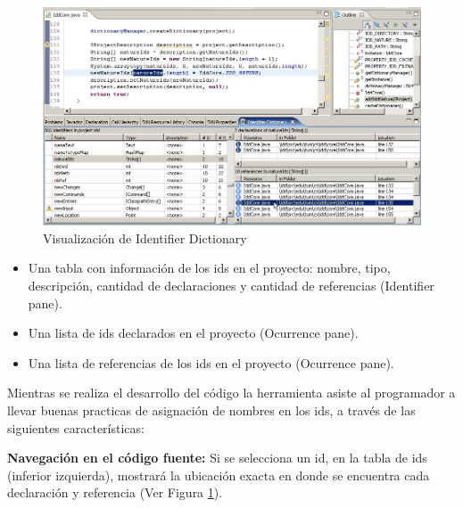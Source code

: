 \begin{figure}[t] %
\centerline{%
\includegraphics[scale= 0.50]{./cap3/idd_3.png}
}
\caption{Visualización de Identifier Dictionary}
\label{captura4}
\end{figure} 

\begin{itemize}
\itemsep0em%
\item Una tabla con información de los ids en el proyecto: nombre, tipo, descripción, cantidad de declaraciones y cantidad de referencias (Identifier pane).
\item Una lista de ids declarados en el proyecto (Ocurrence pane).
\item Una lista de referencias de los ids en el proyecto (Ocurrence pane).
\end{itemize}

Mientras se realiza el desarrollo del código la herramienta asiste al programador a llevar buenas practicas de asignación de nombres en los ids, a través de las siguientes características:

\textbf{Navegación en el código fuente:} Si se selecciona un id, en la tabla de ids (inferior izquierda), mostrará la ubicación exacta en donde se encuentra cada declaración y referencia (Ver Figura \ref{captura4}).

%

